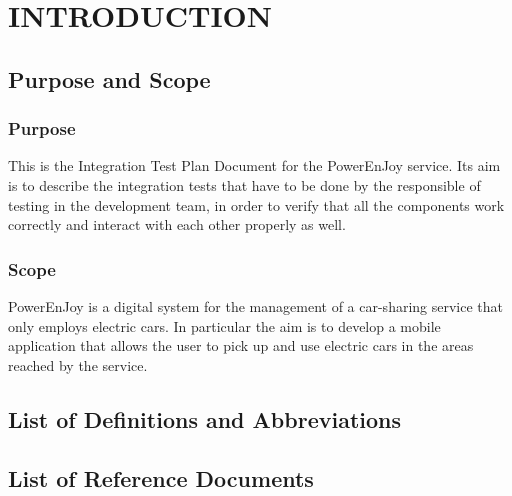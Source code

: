 \section{INTRODUCTION}
\subsection{Purpose and Scope}
\subsubsection{Purpose}

This is the Integration Test Plan Document for the PowerEnJoy service. Its aim is to describe the integration tests that have to be done by the responsible of testing in the development team, in order to verify that all the components work correctly and interact with each other properly as well.
 
\subsubsection{Scope}
PowerEnJoy is a digital system for the management of a car-sharing service that only employs electric cars. In particular the aim is to develop a mobile application that allows the user to pick up and use electric cars in the areas reached by the service.

\subsection{List of Definitions and Abbreviations} 
\subsection{List of Reference Documents}

